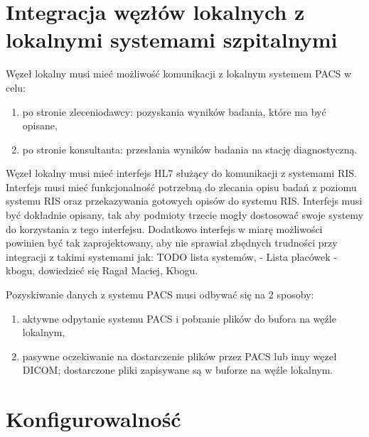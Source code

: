\documentclass[a4paper]{report}
\begin{document}
\section{Integracja węzłów lokalnych z lokalnymi systemami szpitalnymi}

Węzeł lokalny musi mieć możliwość komunikacji z lokalnym systemem PACS w celu:
\begin{enumerate}
 \item po stronie zleceniodawcy: pozyskania wyników badania, które ma być opisane,
 \item po stronie konsultanta: przesłania wyników badania na stację diagnostyczną.
\end{enumerate}

Węzeł lokalny musi mieć interfejs HL7 służący do komunikacji z systemami RIS. Interfejs musi mieć funkcjonalność potrzebną do zlecania opisu badań z poziomu systemu RIS oraz przekazywania gotowych opisów do systemu RIS. Interfejs musi być dokładnie opisany, tak aby podmioty trzecie mogły dostosować swoje systemy do korzystania z tego interfejsu. Dodatkowo interfejs w miarę możliwości powinien być tak zaprojektowany, aby nie sprawiał zbędnych trudności przy integracji z takimi systemami jak: TODO lista systemów, - Lista placówek - kbogu, dowiedzieć się Ragał Maciej, Kbogu. 

Pozyskiwanie danych z systemu PACS musi odbywać się na 2 sposoby:
\begin{enumerate}
  \item aktywne odpytanie systemu PACS i pobranie plików do bufora na węźle lokalnym,
  \item pasywne oczekiwanie na dostarczenie plików przez PACS lub inny węzeł DICOM; dostarczone pliki zapisywane są w buforze na węźle lokalnym.
\end{enumerate}

\section{Konfigurowalność}
\label{zlecenia-konfig}
\end{document}
